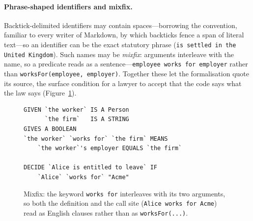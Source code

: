 \documentclass[sigconf,nonacm]{acmart}
\newcommand{\bq}{\char96\relax}            %
\newcommand{\code}[1]{\texttt{\small #1}}
\begin{document}
\paragraph{Phrase-shaped identifiers and mixfix.}
Backtick-delimited identifiers may contain spaces---borrowing the convention,
familiar to every writer of Markdown, by which backticks fence a span of literal
text---so an identifier can be the exact statutory phrase
(\code{\bq is settled in the United Kingdom\bq}).
Such names may be \emph{mixfix}: arguments interleave with the name, so a
predicate reads as a sentence---\code{\bq employee\bq{} \bq works for\bq{} \bq employer\bq}
rather than \code{worksFor(employee, employer)}. Together these let the
formalisation quote its source, the surface condition for a lawyer to accept
that the code says what the law says (Figure~\ref{fig:mixfix}).

\begin{figure}[t]
\begin{lstlisting}
GIVEN `the worker` IS A Person
      `the firm`   IS A STRING
GIVES A BOOLEAN
`the worker` `works for` `the firm` MEANS
    `the worker`'s employer EQUALS `the firm`

DECIDE `Alice is entitled to leave` IF
    `Alice` `works for` "Acme"
\end{lstlisting}
\caption{Mixfix: the keyword \code{\bq works for\bq} interleaves with its two
arguments, so both the definition and the call site
(\code{\bq Alice\bq{} \bq works for\bq{} \bq Acme\bq}) read as English clauses
rather than as \code{worksFor(...)}.}
\label{fig:mixfix}
\end{figure}
\end{document}
